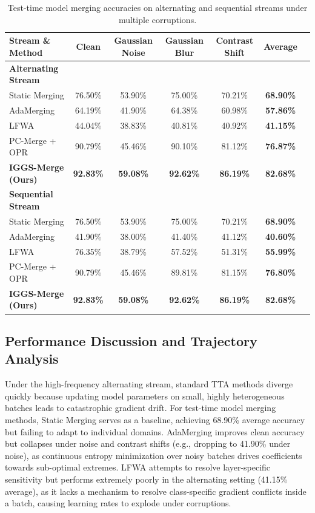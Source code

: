 \documentclass{article}
\theoremstyle{plain}
\theoremstyle{definition}
\theoremstyle{remark}
\begin{document}
\begin{table}[t]
\caption{Test-time model merging accuracies on alternating and sequential streams under multiple corruptions.}
\label{tab:results}
\vskip 0.15in
\begin{center}
\begin{footnotesize}
\begin{tabular}{lcccccr}
\toprule
Stream \& Method & Clean & Gaussian Noise & Gaussian Blur & Contrast Shift & Average \\
\midrule
\textbf{Alternating Stream} & & & & & \\
Static Merging & 76.50\% & 53.90\% & 75.00\% & 70.21\% & \textbf{68.90\%} \\
AdaMerging & 64.19\% & 41.90\% & 64.38\% & 60.98\% & \textbf{57.86\%} \\
LFWA & 44.04\% & 38.83\% & 40.81\% & 40.92\% & \textbf{41.15\%} \\
PC-Merge + OPR & 90.79\% & 45.46\% & 90.10\% & 81.12\% & \textbf{76.87\%} \\
\textbf{IGGS-Merge (Ours)} & \textbf{92.83\%} & \textbf{59.08\%} & \textbf{92.62\%} & \textbf{86.19\%} & \textbf{82.68\%} \\
\midrule
\textbf{Sequential Stream} & & & & & \\
Static Merging & 76.50\% & 53.90\% & 75.00\% & 70.21\% & \textbf{68.90\%} \\
AdaMerging & 41.90\% & 38.00\% & 41.40\% & 41.12\% & \textbf{40.60\%} \\
LFWA & 76.35\% & 38.79\% & 57.52\% & 51.31\% & \textbf{55.99\%} \\
PC-Merge + OPR & 90.79\% & 45.46\% & 89.81\% & 81.15\% & \textbf{76.80\%} \\
\textbf{IGGS-Merge (Ours)} & \textbf{92.83\%} & \textbf{59.08\%} & \textbf{92.62\%} & \textbf{86.19\%} & \textbf{82.68\%} \\
\bottomrule
\end{tabular}
\end{footnotesize}
\end{center}
\vskip -0.1in
\end{table}

\subsection{Performance Discussion and Trajectory Analysis}
Under the high-frequency alternating stream, standard TTA methods diverge quickly because updating model parameters on small, highly heterogeneous batches leads to catastrophic gradient drift. For test-time model merging methods, Static Merging serves as a baseline, achieving 68.90\% average accuracy but failing to adapt to individual domains. AdaMerging improves clean accuracy but collapses under noise and contrast shifts (e.g., dropping to 41.90\% under noise), as continuous entropy minimization over noisy batches drives coefficients towards sub-optimal extremes. LFWA attempts to resolve layer-specific sensitivity but performs extremely poorly in the alternating setting (41.15\% average), as it lacks a mechanism to resolve class-specific gradient conflicts inside a batch, causing learning rates to explode under corruptions.
\end{document}
